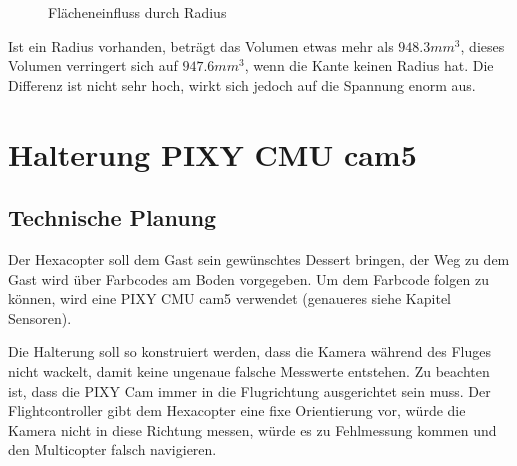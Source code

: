 			\begin{figure}[H]
				\begin{centering}
				\caption{Flächeneinfluss durch Radius}
				\par\end{centering}
				\label{klammer_radius}
			\end{figure}

	Ist ein Radius vorhanden, beträgt das Volumen etwas mehr als $948.3 mm^{3}$, dieses Volumen verringert sich auf $947.6 mm^{3}$, wenn die Kante keinen Radius hat. Die Differenz ist nicht sehr hoch, wirkt sich jedoch auf die Spannung enorm aus.

			\newpage

\section{Halterung PIXY CMU cam5}

	\subsection{Technische Planung}

	Der Hexacopter soll dem Gast sein gewünschtes Dessert bringen, der Weg zu dem Gast wird über Farbcodes am Boden vorgegeben.
	Um dem Farbcode folgen zu können, wird eine PIXY CMU cam5 verwendet (genaueres siehe Kapitel Sensoren).

	Die Halterung soll so konstruiert werden, dass die Kamera während des Fluges nicht wackelt, damit keine ungenaue \bzw falsche Messwerte entstehen.
	Zu beachten ist, dass die PIXY Cam immer in die Flugrichtung ausgerichtet sein muss.
	Der Flightcontroller gibt dem Hexacopter eine fixe Orientierung vor, würde die Kamera nicht in diese Richtung messen, würde es zu Fehlmessung kommen und den Multicopter falsch navigieren.

